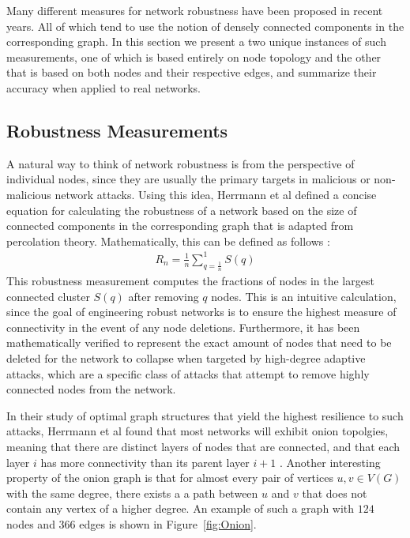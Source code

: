 \documentclass[11pt]{article}
\begin{document}
Many different measures for network robustness have been proposed in recent years. All of which tend
to use the notion of densely connected components in the corresponding graph. In this section we present
a two unique instances of such measurements, one of which is based entirely on node topology and the other that is based on both nodes and their respective edges, and summarize their accuracy when applied to real networks.

\subsection{Robustness Measurements}
A natural way to think of network robustness is from the perspective of individual nodes, since they are 
usually the primary targets in malicious or non-malicious network attacks. Using this idea, Herrmann et al
defined a concise equation for calculating the robustness of a network based on the size of connected
components in the corresponding graph that is adapted from percolation theory. Mathematically, this can be defined as follows \cite{Onion}:
\begin{eqnarray*}
R_{n} = \frac{1}{n}\sum_{q=\frac{1}{n}}^{1}S(q)
\end{eqnarray*}
This robustness measurement computes the fractions of nodes in the largest connected cluster $S(q)$ after removing $q$ nodes. This is an intuitive calculation, since the goal of engineering robust networks is to ensure the highest measure of connectivity in the event of any node deletions. Furthermore, it has been mathematically verified to represent the exact amount of nodes that need to be deleted for the network to collapse when targeted by high-degree adaptive attacks, which are a specific class of attacks that attempt to remove highly connected nodes from the network. 

In their study of optimal graph structures that yield the highest resilience to such attacks, Herrmann et al found that most networks will exhibit onion topolgies, meaning that there are distinct layers of nodes that are connected, and that each layer $i$ has more connectivity than its parent layer $i+1$ \cite{Onion}. Another interesting property of the onion graph is that for almost every pair of vertices $u, v \in V(G)$ with the same degree, there exists a a path between $u$ and $v$ that does not contain any vertex of a higher degree. An example of such a graph with $124$ nodes and $366$ edges is shown in Figure~\ref{fig:Onion}.
\end{document}
